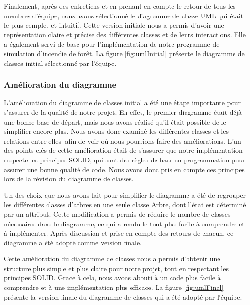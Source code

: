 Finalement, après des entretiens et en prenant en compte le retour de tous les membres d’équipe, nous avons sélectionné le diagramme de classe UML qui était le plus complet et intuitif. Cette version initiale nous a permis d'avoir une représentation claire et précise des différentes classes et de leurs interactions. Elle a également servi de base pour l'implémentation de notre programme de simulation d'incendie de forêt. La figure \ref{fig:umlInitial} présente le diagramme de classes initial sélectionné par l’équipe.


\subsubsection{Amélioration du diagramme}

L'amélioration du diagramme de classes initial a été une étape importante pour s'assurer de la qualité de notre projet. En effet, le premier diagramme était déjà une bonne base de départ, mais nous avons réalisé qu'il était possible de le simplifier encore plus. Nous avons donc examiné les différentes classes et les relations entre elles, afin de voir où nous pourrions faire des améliorations. L'un des points clés de cette amélioration était de s'assurer que notre implémentation respecte les principes SOLID, qui sont des règles de base en programmation pour assurer une bonne qualité de code. Nous avons donc pris en compte ces principes lors de la révision du diagramme de classes.

Un des choix que nous avons fait pour simplifier le diagramme a été de regrouper les différentes classes d'arbres en une seule classe Arbre, dont l'état est déterminé par un attribut. Cette modification a permis de réduire le nombre de classes nécessaires dans le diagramme, ce qui a rendu le tout plus facile à comprendre et à implémenter. Après discussion et prise en compte des retours de chacun, ce diagramme a été adopté comme version finale.

Cette amélioration du diagramme de classes nous a permis d'obtenir une structure plus simple et plus claire pour notre projet, tout en respectant les principes SOLID. Grace à cela, nous avons abouti à un code plus facile à comprendre et à une implémentation plus efficace. La figure \ref{fig:umlFinal} présente la version finale du diagramme de classes qui a été adopté par l’équipe.


